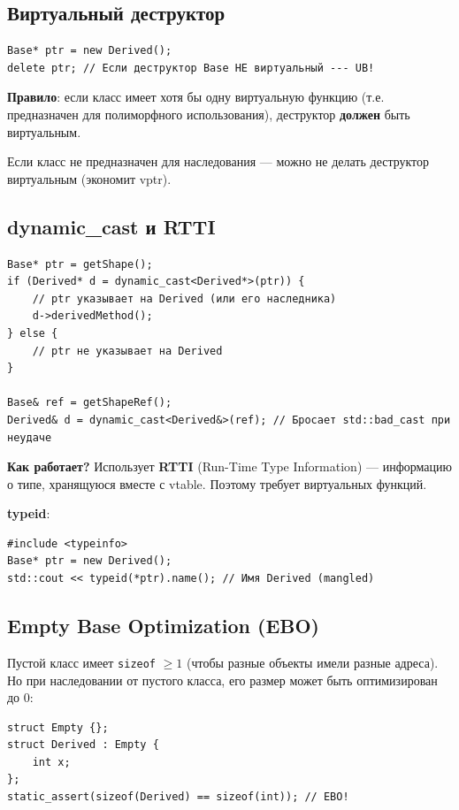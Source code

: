 \documentclass[12pt,a4paper]{article}
\begin{document}
\subsection{Виртуальный деструктор}

\begin{lstlisting}
Base* ptr = new Derived();
delete ptr; // Если деструктор Base НЕ виртуальный --- UB!
\end{lstlisting}

\textbf{Правило}: если класс имеет хотя бы одну виртуальную функцию (т.е. предназначен для полиморфного использования), деструктор \textbf{должен} быть виртуальным.

Если класс не предназначен для наследования --- можно не делать деструктор виртуальным (экономит vptr).

\subsection{dynamic\_cast и RTTI}

\begin{lstlisting}
Base* ptr = getShape();
if (Derived* d = dynamic_cast<Derived*>(ptr)) {
    // ptr указывает на Derived (или его наследника)
    d->derivedMethod();
} else {
    // ptr не указывает на Derived
}

Base& ref = getShapeRef();
Derived& d = dynamic_cast<Derived&>(ref); // Бросает std::bad_cast при неудаче
\end{lstlisting}

\textbf{Как работает?} Использует \textbf{RTTI} (Run-Time Type Information) --- информацию о типе, хранящуюся вместе с vtable. Поэтому требует виртуальных функций.

\textbf{typeid}:
\begin{lstlisting}
#include <typeinfo>
Base* ptr = new Derived();
std::cout << typeid(*ptr).name(); // Имя Derived (mangled)
\end{lstlisting}

\subsection{Empty Base Optimization (EBO)}

Пустой класс имеет \texttt{sizeof} $\ge 1$ (чтобы разные объекты имели разные адреса). Но при наследовании от пустого класса, его размер может быть оптимизирован до 0:

\begin{lstlisting}
struct Empty {};
struct Derived : Empty {
    int x;
};
static_assert(sizeof(Derived) == sizeof(int)); // EBO!
\end{lstlisting}
\end{document}
